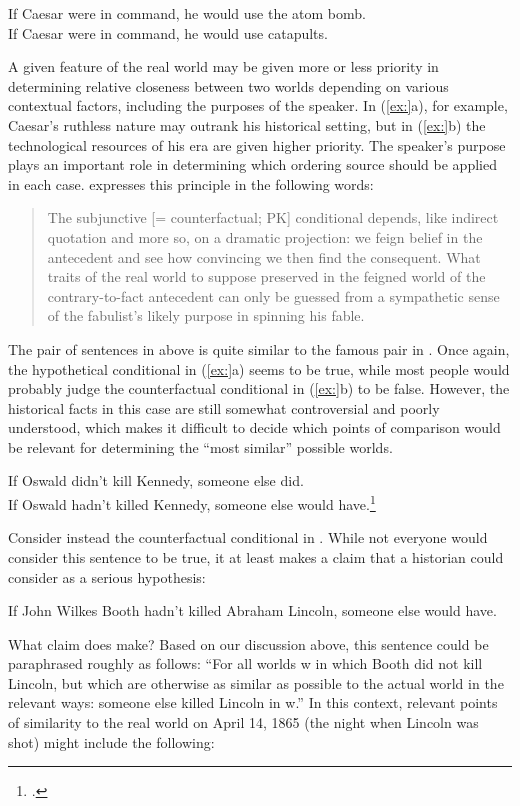 \ea
\ea If Caesar were in command, he would use the atom bomb.\\
\ex If Caesar were in command, he would use catapults.
                       \z
\z


A given feature of the real world may be given more or less priority in determining relative closeness between two worlds depending on various contextual factors, including the purposes of the speaker. In (\ref{ex:}a), for example, Caesar’s ruthless nature may outrank his historical setting, but in (\ref{ex:}b) the technological resources of his era are given higher priority. The speaker’s purpose plays an important role in determining which ordering source should be applied in each case. \citet[221]{Quine1960} expresses this principle in the following words:


\begin{quote}
The subjunctive [= counterfactual; PK] conditional depends, like indirect quotation and more so, on a dramatic projection: we feign belief in the antecedent and see how convincing we then find the consequent. What traits of the real world to suppose preserved in the feigned world of the contrary-to-fact antecedent can only be guessed from a sympathetic sense of the fabulist’s likely purpose in spinning his fable.
\end{quote}


The pair of sentences in  above is quite similar to the famous pair in . Once again, the hypothetical conditional in (\ref{ex:}a) seems to be true, while most people would probably judge the counterfactual conditional in (\ref{ex:}b) to be false. However, the historical facts in this case are still somewhat controversial and poorly understood, which makes it difficult to decide which points of comparison would be relevant for determining the “most similar” possible worlds.


\ea
\ea If Oswald didn’t kill Kennedy, someone else did. \\
\ex If Oswald hadn’t killed Kennedy, someone else would have.\footnote{\citet{Adams1970}.}
                       \z
\z


Consider instead the counterfactual conditional in . While not everyone would consider this sentence to be true, it at least makes a claim that a historian could consider as a serious hypothesis:


\ea
If John Wilkes Booth hadn’t killed Abraham Lincoln, someone else would have.
\z


What claim does  make? Based on our discussion above, this sentence could be paraphrased roughly as follows: “For all worlds w in which Booth did not kill Lincoln, but which are otherwise as similar as possible to the actual world in the relevant ways: someone else killed Lincoln in w.” In this context, relevant points of similarity to the real world on April 14, 1865 (the night when Lincoln was shot) might include the following:


